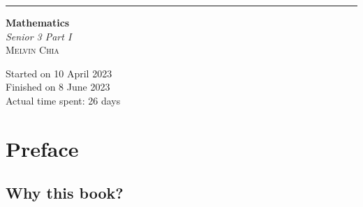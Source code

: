 \documentclass[12pt]{report}
\begin{document}
\newcommand{\sol}[1]{

    \noindent \textbf{Sol.}
}
\newcommand{\prooff}[1]{

    \noindent \textbf{Proof.}
}

\newcommand{\sxrightarrow}[2][]{%
    \mathrel{\text{$\xrightarrow[#1]{#2}$}}%
}

\newenvironment{cequation}{
    \makeatletter
    \setbool{@fleqn}{false}
    \makeatother
    \begin{equation*}
        }{\end{equation*}}

\begin{titlepage}
    \raggedleft{}
    \rule{1pt}{\textheight}
    \hspace{0.02\textwidth}
    \parbox[b]{0.75\textwidth}{

    {\fontsize{40}{60}\selectfont\bfseries Mathematics}\\[2\baselineskip]
    {\huge\textit{Senior 3 Part I}}\\[4\baselineskip]
    {\Large\textsc{Melvin Chia}}

    \vspace{0.5\textheight}

    {\noindent Started on 10 April 2023}\\[\baselineskip]
    {\noindent Finished on 8 June 2023}\\[\baselineskip]
    {\noindent Actual time spent: 26 days}\\[\baselineskip]}

\end{titlepage}

\onehalfspacing{}

\vspace{-10cm}
\titleformat{\chapter}[display]
{\normalfont\huge\bfseries}{\chaptertitlename\ \thechapter}{20pt}{\Huge}
\titlespacing*{\chapter}{0pt}{-20pt}{40pt}
\chapter*{Preface}
\section*{Why this book?}
\end{document}

